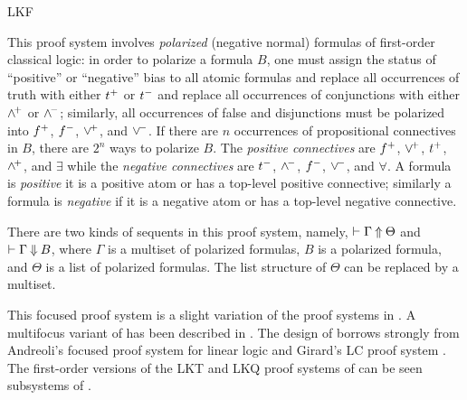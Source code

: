 \begin{entry}{LKF}
\begin{clarifications}
This proof system involves \emph{polarized} (negative normal) formulas
of first-order classical logic: in order to polarize a formula $B$,
one must assign the status of ``positive'' or ``negative'' bias to all
atomic formulas and replace all occurrences of truth with either
$t^+$ or $t^-$ and replace all occurrences of conjunctions with
either $\wedge^{\!+}$ or $\wedge^{\!-}$; similarly, all occurrences of false and
disjunctions must be polarized into $f^+$, $f^-$, $\vee^{\!+}$, and
$\vee^{\!-}$. If there are $n$ occurrences of propositional connectives
in $B$, there are $2^n$ ways to polarize $B$.
The \emph{positive connectives} are $f^+$, $\vee^{\!+}$, $t^+$,
$\wedge^{\!+}$, and $\exists$ while the \emph{negative connectives} are
$t^-$, $\wedge^{\!-}$, $f^-$, $\vee^{\!-}$, and $\forall$.
A formula is \emph{positive} it is a positive atom or has a top-level
positive connective; similarly a formula is \emph{negative} if it is a
negative atom or has a top-level negative connective.

There are two kinds of sequents in this proof system, namely,
$\vdash\Gamma\mathbin{\Uparrow} \Theta$ and $\vdash\Gamma\mathbin{\Downarrow} B$, where $\Gamma$ is a
multiset of polarized formulas, $B$ is a polarized formula, and
$\Theta$ is a list of polarized formulas.  The list structure of
$\Theta$ can be replaced by a multiset.
\end{clarifications}

\begin{history}
This focused proof system is a slight variation of the proof systems in
\cite{liang09tcs,liang07csl}.  
A multifocus variant of \LKF has been described in \cite{chaudhuri14jlc}.
The design of \LKF borrows strongly from Andreoli's focused proof system for
linear logic \cite{andreoli92jlc} and Girard's LC proof
system \cite{girard91mscs}.  The first-order versions 
of the LKT and LKQ proof systems of \cite{danos93wll} can be seen 
subsystems of \LKF.
\end{history}


\end{entry}
